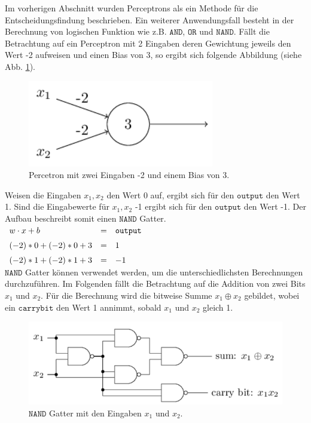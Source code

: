\noindent
Im vorherigen Abschnitt wurden Perceptrons als ein Methode für die Entscheidungsfindung beschrieben. Ein weiterer Anwendungsfall besteht in der Berechnung von logischen Funktion wie z.B. $\mathtt{AND}$, $\mathtt{OR}$ und $\mathtt{NAND}$. Fällt die Betrachtung auf ein Perceptron mit 2 Eingaben deren Gewichtung jeweils den Wert -2 aufweisen und einen Bias von 3, so ergibt sich folgende Abbildung (siehe Abb. \ref{fig:perceptron_example}).
\begin{figure}[hbt]
	\centering
	\includegraphics[scale=0.6]{Bilder/perceptron_example}
	\caption{Percetron mit zwei Eingaben -2 und einem Bias von 3.} 
	\label{fig:perceptron_example} 
\end{figure}

\noindent
Weisen die Eingaben $x_1, x_2$ den Wert 0 auf, ergibt sich für den $\mathtt{output}$ den Wert 1. Sind die Eingabewerte für $x_1, x_2$ -1 ergibt sich für den $\mathtt{output}$ den Wert -1. Der Aufbau beschreibt somit einen $\mathtt{NAND}$ Gatter.\\[0.2cm]
\hspace*{1.3cm}
$
\begin{array}[t]{lcll}
	w \cdot x + b & = & \mathtt{output} \\[0.2cm]
	(-2)*0+(-2)*0+3 & = & 1 \\[0.2cm]
	(-2)*1+(-2)*1+3 & = & -1
\end{array}
$
\\[0.2cm]
$\mathtt{NAND}$ Gatter können verwendet werden, um die unterschiedlichsten Berechnungen durchzuführen. Im Folgenden fällt die Betrachtung auf die Addition von zwei Bits $x_1$ und $x_2$. Für die Berechnung wird die bitweise Summe $x_1 \oplus x_2$ gebildet, wobei ein $\mathtt{carry bit}$ den Wert 1 annimmt, sobald $x_1$ und $x_2$ gleich 1.
\begin{figure}[hbt]
	\centering
	\includegraphics[scale=0.6]{Bilder/nand_gatter}
	\caption{$\mathtt{NAND}$ Gatter mit den Eingaben $x_1$ und $x_2$.} 
	\label{fig:nand_gatter} 
\end{figure}

